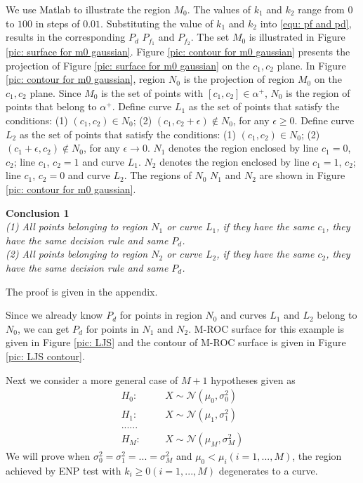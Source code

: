 \documentclass[12pt,journal,a4paper,twoside,onecolumn]{IEEEtran}
\begin{document}
\begin{spacing}{2.5}
We use Matlab to illustrate the region $M_0$. The values of $k_1$ and $k_2$ range from $0$ to $100$ in steps of $0.01$. Substituting the value of $k_1$ and $k_2$ into \eqref{equ: pf and pd}, results in the corresponding $P_d$ $P_{f_1}$ and $P_{f_2}$.  The set $M_0$ is illustrated in Figure \ref{pic: surface for m0 gaussian}. Figure \ref{pic: contour for m0 gaussian} presents the projection of Figure \ref{pic: surface for m0 gaussian} on the $c_1, c_2$ plane.
In Figure \ref{pic: contour for m0 gaussian}, region $N_0$ is the projection of region $M_0$ on the $c_1, c_2$ plane. Since $M_0$ is the set of points with $[c_1, c_2] \in \alpha^+$, $N_0$ is the region of points that belong to $\alpha^+$.
Define curve $L_1$ as the set of points that satisfy the conditions: (1) $(c_1, c_2) \in N_0$; (2) $(c_1, c_2+\epsilon) \notin N_0$, for any $\epsilon \geq 0$. Define curve $L_2$ as the set of points that satisfy the conditions: (1) $(c_1, c_2) \in N_0$; (2) $(c_1 + \epsilon, c_2) \notin N_0$, for any $\epsilon \rightarrow 0$.
$N_1$ denotes the region enclosed by line $c_1 = 0$, $c_2$; line $c_1$, $c_2 = 1$ and curve $L_1$.
$N_2$ denotes the region enclosed by line $c_1 = 1$, $c_2$; line $c_1$, $c_2 = 0$ and curve $L_2$.
The regions of $N_0$ $N_1$ and $N_2$ are shown in Figure \ref{pic: contour for m0 gaussian}.

\textbf{Conclusion 1}
\textit{\\(1) All points belonging to region $N_1$ or curve $L_1$, if they have the same $c_1$, they have the same decision rule and same $P_d$.
\\(2) All points belonging to region $N_2$ or curve $L_2$, if they have the same $c_2$, they have the same decision rule and same $P_d$.
}

The proof is given in the appendix.

Since we already know $P_d$ for points in region $N_0$ and curves $L_1$ and $L_2$ belong to $N_0$, we can get $P_d$ for points in $N_1$ and $N_2$. M-ROC surface for this example is given in Figure  \ref{pic: LJS} and the contour of M-ROC surface is given in Figure \ref{pic: LJS contour}.

Next we consider a more general case of $M+1$ hypotheses given as
\begin{equation}
\label{equ: m+1 Gaussian Hypo}
\begin{split}
H_0:\;\;\;\;\;\;&X\sim \mathcal{N}(\mu_0, \sigma_0^2)\\
H_1:\;\;\;\;\;\;&X\sim \mathcal{N}(\mu_1, \sigma_1^2)\\
  ......\\
H_M:\;\;\;\;\;\;&X\sim \mathcal{N}(\mu_M, \sigma_M^2)
\end{split}
\end{equation}
We will prove when $\sigma_0^2 = \sigma_1^2 = ... = \sigma_M^2$ and $\mu_0 < \mu_i (i = 1, ..., M)$, the region achieved by ENP test with $k_i \geq 0 (i = 1, ..., M)$ degenerates to a curve.


\end{spacing}
\end{document}
